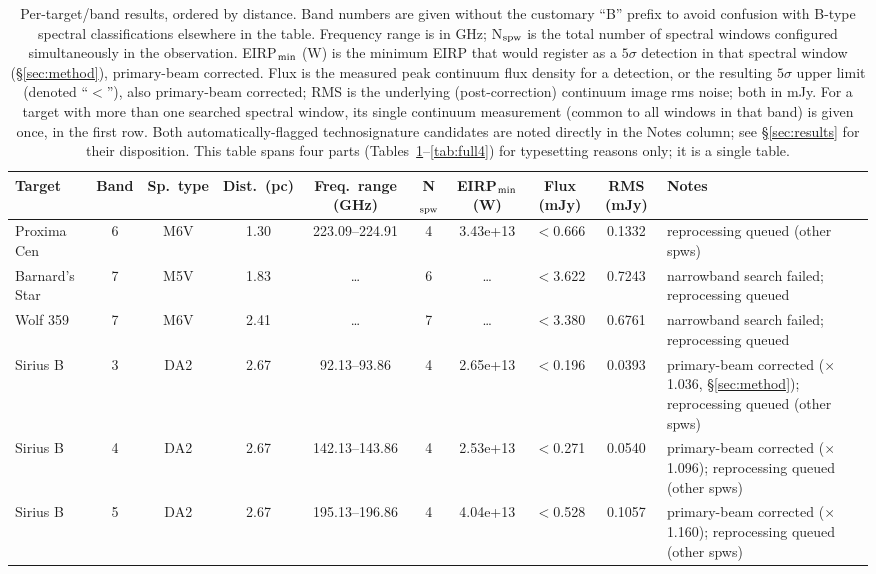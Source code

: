 \documentclass{openjournal}
\begin{document}
\begin{table}
\centering
\scriptsize
\caption{Per-target/band results, ordered by distance. Band numbers are
given without the customary ``B'' prefix to avoid confusion with B-type
spectral classifications elsewhere in the table. Frequency range is in
GHz; N$_{\rm spw}$ is the total number of spectral windows configured
simultaneously in the observation. EIRP$_{\rm min}$ (W) is the minimum
EIRP that would register as a $5\sigma$ detection in that spectral
window (\S\ref{sec:method}), primary-beam corrected. Flux is the measured
peak continuum flux density for a detection, or the resulting $5\sigma$
upper limit (denoted ``$<$''), also primary-beam corrected; RMS is the
underlying (post-correction) continuum image rms noise; both in mJy. For
a target with more than one searched spectral window, its single
continuum measurement (common to all windows in that band) is given once,
in the first row. Both automatically-flagged technosignature candidates
are noted directly in the Notes column; see \S\ref{sec:results} for their
disposition. This table spans four parts (Tables~\ref{tab:full}--\ref{tab:full4})
for typesetting reasons only; it is a single table.}
\label{tab:full}
\begin{tabularx}{\textwidth}{@{}l c c c c c c c c X@{}}
\hline
Target & Band & Sp.\ type & Dist.\ (pc) & Freq.\ range (GHz) & N$_{\rm spw}$ & EIRP$_{\rm min}$ (W) & Flux (mJy) & RMS (mJy) & Notes \\
\hline
Proxima Cen & 6 & M6V & 1.30 & 223.09--224.91 & 4 & 3.43e+13 & $<$0.666 & 0.1332 & reprocessing queued (other spws) \\
Barnard's Star & 7 & M5V & 1.83 & \ldots & 6 & \ldots & $<$3.622 & 0.7243 & narrowband search failed; reprocessing queued \\
Wolf  359 & 7 & M6V & 2.41 & \ldots & 7 & \ldots & $<$3.380 & 0.6761 & narrowband search failed; reprocessing queued \\
Sirius B & 3 & DA2 & 2.67 & 92.13--93.86 & 4 & 2.65e+13 & $<$0.196 & 0.0393 & primary-beam corrected ($\times$1.036, \S\ref{sec:method}); reprocessing queued (other spws) \\
Sirius B & 4 & DA2 & 2.67 & 142.13--143.86 & 4 & 2.53e+13 & $<$0.271 & 0.0540 & primary-beam corrected ($\times$1.096); reprocessing queued (other spws) \\
Sirius B & 5 & DA2 & 2.67 & 195.13--196.86 & 4 & 4.04e+13 & $<$0.528 & 0.1057 & primary-beam corrected ($\times$1.160); reprocessing queued (other spws) \\

\end{tabularx}
\end{table}
\end{document}
